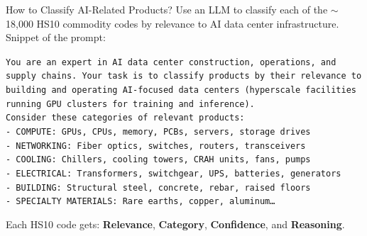 \documentclass[11pt,pdftex,aspectratio=1610]{beamer}
\begin{document}
\begin{frame}[t]{How to Classify AI-Related Products?}
Use an LLM to classify each of the $\sim$18,000 HS10 commodity codes by relevance to AI data center infrastructure. Snippet of the prompt:\\
{\tiny
\begin{tcolorbox}[colback=gray!5!white, colframe=gray!50!white, boxrule=0.5pt, top=3mm, bottom=3mm, left=3mm, right=3mm]
{\small \texttt{You are an expert in AI data center construction, operations, and supply chains. Your task is to classify products by their relevance to building and operating AI-focused data centers (hyperscale facilities running GPU clusters for training and inference).}\\

\texttt{Consider these categories of relevant products:}\\
\texttt{- COMPUTE: GPUs, CPUs, memory, PCBs, servers, storage drives}\\
\texttt{- NETWORKING: Fiber optics, switches, routers, transceivers}\\
\texttt{- COOLING: Chillers, cooling towers, CRAH units, fans, pumps}\\
\texttt{- ELECTRICAL: Transformers, switchgear, UPS, batteries, generators}\\
\texttt{- BUILDING: Structural steel, concrete, rebar, raised floors}\\
\texttt{- SPECIALTY MATERIALS: Rare earths, copper, aluminum\ldots}}
\end{tcolorbox}}
\medskip
{\small Each HS10 code gets: \textbf{Relevance}, \textbf{Category}, \textbf{Confidence}, and \textbf{Reasoning}.}
\end{frame}

\end{document}
